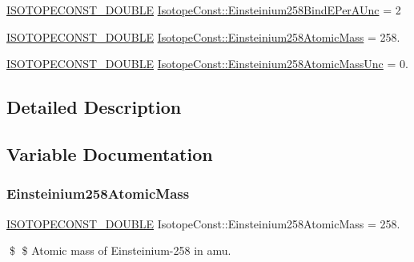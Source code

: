 \begin{DoxyCompactItemize}
\mbox{\hyperlink{group___isotope_const-_macros_ga8f45a7272ce02c0b4c65c44636ed719a}{I\+S\+O\+T\+O\+P\+E\+C\+O\+N\+S\+T\+\_\+\+D\+O\+U\+B\+LE}} \mbox{\hyperlink{group___isotope_const-_einsteinium-_es258_gaefa665e63265d367b75748cfb0117cea}{Isotope\+Const\+::\+Einsteinium258\+Bind\+E\+Per\+A\+Unc}} = 2
\item 
\mbox{\hyperlink{group___isotope_const-_macros_ga8f45a7272ce02c0b4c65c44636ed719a}{I\+S\+O\+T\+O\+P\+E\+C\+O\+N\+S\+T\+\_\+\+D\+O\+U\+B\+LE}} \mbox{\hyperlink{group___isotope_const-_einsteinium-_es258_ga368c0b024bad76243c43cb76cb64f62f}{Isotope\+Const\+::\+Einsteinium258\+Atomic\+Mass}} = 258.
\item 
\mbox{\hyperlink{group___isotope_const-_macros_ga8f45a7272ce02c0b4c65c44636ed719a}{I\+S\+O\+T\+O\+P\+E\+C\+O\+N\+S\+T\+\_\+\+D\+O\+U\+B\+LE}} \mbox{\hyperlink{group___isotope_const-_einsteinium-_es258_gab9b143cb8ec495f2b49eca591c817b14}{Isotope\+Const\+::\+Einsteinium258\+Atomic\+Mass\+Unc}} = 0.
\end{DoxyCompactItemize}


\subsection{Detailed Description}


\subsection{Variable Documentation}
\mbox{\label{group___isotope_const-_einsteinium-_es258_ga368c0b024bad76243c43cb76cb64f62f}} 
\subsubsection{\texorpdfstring{Einsteinium258\+Atomic\+Mass}{Einsteinium258AtomicMass}}
{\footnotesize\ttfamily \mbox{\hyperlink{group___isotope_const-_macros_ga8f45a7272ce02c0b4c65c44636ed719a}{I\+S\+O\+T\+O\+P\+E\+C\+O\+N\+S\+T\+\_\+\+D\+O\+U\+B\+LE}} Isotope\+Const\+::\+Einsteinium258\+Atomic\+Mass = 258.}

\$ \$ Atomic mass of Einsteinium-\/258 in amu. \mbox{\label{group___isotope_const-_einsteinium-_es258_gab9b143cb8ec495f2b49eca591c817b14}} 
